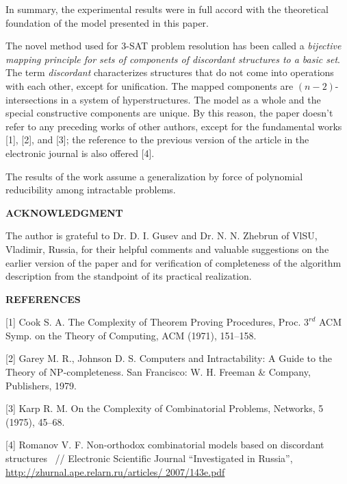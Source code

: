 \documentclass[12pt, a4paper]{article}
\begin{document}
In summary, the experimental results were in full accord with the theoretical foundation of the model presented in this paper.

The novel method used for 3-SAT problem resolution has been called a {\it bijective mapping principle for sets of components of discordant structures to a basic set}. The term {\it discordant} characterizes structures that do not come into operations with each other, except for unification.
The mapped components are $(n-2)$-intersections in a system of hyperstructures. The model as
a whole and the special constructive components are unique. By this reason, the paper doesn't refer to any preceding works of other authors, except for the fundamental works [1],  [2], and [3]; the reference to the previous version of the article in the electronic journal is also offered [4].

The results of the work assume a generalization by force of polynomial reducibility among intractable problems.

\begin{center}
{\bf ACKNOWLEDGMENT}
\end{center}

The author is grateful to Dr. D. I. Gusev and Dr. N. N. Zhebrun of VlSU, Vladimir, Russia, for their helpful comments and valuable suggestions on the earlier version of the paper and for verification of completeness of the algorithm description from the standpoint of its practical realization.

\begin{center}
{\bf REFERENCES}
\end{center}

[1]  Cook S. A. The Complexity of Theorem Proving Procedures, Proc. $3^{rd}$ ACM Symp. \hspace*{1.1cm} on the Theory of Computing,   
       ACM (1971), 151--158.

[2]  Garey M. R., Johnson D. S. Computers and Intractability: A Guide to the Theory of \hspace*{1.1cm}  NP-completeness. San Francisco:    
       W. H. Freeman \& Company, Publishers, 1979.

[3]   Karp R. M. On the Complexity of Combinatorial Problems, Networks, 5 (1975), 45--68.

[4]  Romanov V. F. Non-orthodox combinatorial models based on discordant structures~ //  \hspace*{1.1cm} Electronic Scientific Journal ``Investigated in Russia'', \\ \hspace*{1.1cm} \href{http://zhurnal.ape.relarn.ru/ articles/2007/143e.pdf}{http://zhurnal.ape.relarn.ru/articles/
2007/143e.pdf}
\end{document}
